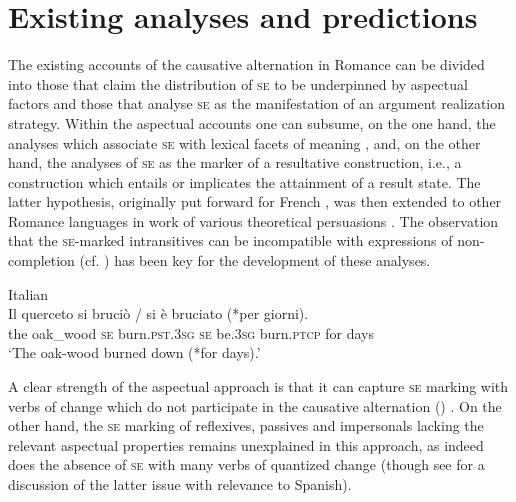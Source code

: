 \documentclass[output=paper,colorlinks,citecolor=brown
]{langscibook}
\begin{document}
\section{Existing analyses and predictions}
\label{bentley_section_2}
The existing accounts of the causative alternation in Romance can be divided into those that claim the distribution of \textsc{se} to be underpinned by aspectual factors and those that analyse \textsc{se} as the manifestation of an argument realization strategy. Within the aspectual accounts one can subsume, on the one hand, the analyses which associate \textsc{se} with lexical facets of meaning \citep{cennamo2012aspectual,cennamo2015valency,cennamo2021anticausatives,vivanco2021scalar}, and, on the other hand, the analyses of \textsc{se} as the marker of a resultative construction, i.e., a construction which entails or implicates the attainment of a result state. The latter hypothesis, originally put forward for French \citep{zribi1987reflexivite}, was then extended to other Romance languages in work of various theoretical persuasions \citep{jezek2003classi,folli2002constructing,folli2005consuming,manente2008laspect,labelle2010anticausative,cennamo2011anticausative,cennamo2012aspectual}. The observation that the \textsc{se}-marked intransitives can be incompatible with expressions of non-completion (cf. ) has been key for the development of these analyses.

\ea  \label{bentley_example_2}
Italian \citep[401]{cennamo2012aspectual} \\
\gll Il querceto si bruciò / si è bruciato {(*per giorni)}.\\
the	oak\_wood \textsc{se} burn.\textsc{pst}.3\textsc{sg} {} \textsc{se} be.3\textsc{sg} burn.\textsc{ptcp} {for days} {} \\
\glt `The oak-wood burned down (*for days).’
\z

A clear strength of the aspectual approach is that it can capture \textsc{se} marking with verbs of change which do not participate in the causative alternation () \citep{miguel2000operador,acedomatellan2022argument}. On the other hand, the \textsc{se} marking of reflexives, passives and impersonals lacking the relevant aspectual properties remains unexplained in this approach, as indeed does the absence of \textsc{se} with many verbs of quantized change (though see \cite{vivanco2021scalar} for a discussion of the latter issue with relevance to Spanish).
\end{document}
